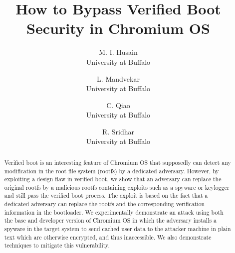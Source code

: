\documentclass[11pt]{article}
\begin{document}

\date{}

\title{How to Bypass Verified Boot Security in Chromium OS}
\author{
{\rm M. I. Husain}\\
University at Buffalo
\and
{\rm L. Mandvekar}\\
University at Buffalo
\and
{\rm C. Qiao}\\
University at Buffalo
\and
{\rm R. Sridhar}\\
University at Buffalo
} %

\maketitle


\thispagestyle{empty}


\begin{abstract}
Verified boot is an interesting feature of Chromium OS that supposedly can detect any modification in the root file system (rootfs) by a dedicated adversary. However, by exploiting a design flaw in verified boot, we show that an adversary can replace the original rootfs by a malicious rootfs containing exploits such as a spyware or keylogger and still pass the verified boot process. The exploit is based on the fact that a dedicated adversary can replace the rootfs and the corresponding verification information in the bootloader. We experimentally demonstrate an attack using both the base and developer version of Chromium OS in which the adversary installs a spyware in the target system to send cached user data to the attacker machine in plain text which are otherwise encrypted, and thus inaccessible. We also demonstrate techniques to mitigate this vulnerability.
\end{abstract}

\end{document}
